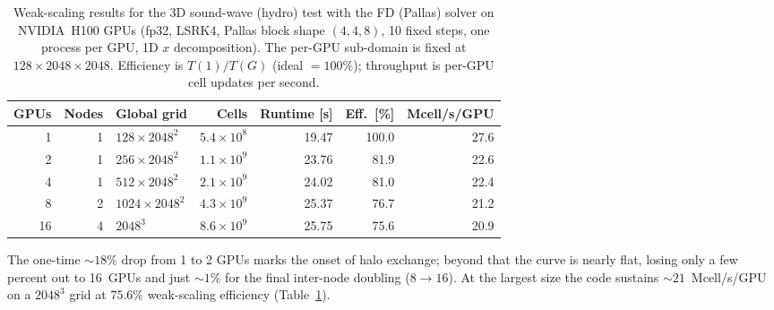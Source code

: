 \begin{table}
    \centering
    \caption{Weak-scaling results for the 3D sound-wave (hydro) test with
    the FD (Pallas) solver on NVIDIA~H100 GPUs (fp32, LSRK4, Pallas block
    shape $(4,4,8)$, 10 fixed steps, one process per GPU, 1D $x$
    decomposition). The per-GPU sub-domain is fixed at
    $128\times2048\times2048$. Efficiency is $T(1)/T(G)$ (ideal $=100\%$);
    throughput is per-GPU cell updates per second.}
    \label{tab:weak_scaling}
    \begin{tabular}{rrlrrrr}
        \toprule
        GPUs & Nodes & Global grid & Cells & Runtime [s] & Eff.\ [\%] & Mcell/s/GPU \\
        \midrule
         1 & 1 & $128\times2048^2$  & $5.4\times10^{8}$ & 19.47 & 100.0 & 27.6 \\
         2 & 1 & $256\times2048^2$  & $1.1\times10^{9}$ & 23.76 &  81.9 & 22.6 \\
         4 & 1 & $512\times2048^2$  & $2.1\times10^{9}$ & 24.02 &  81.0 & 22.4 \\
         8 & 2 & $1024\times2048^2$ & $4.3\times10^{9}$ & 25.37 &  76.7 & 21.2 \\
        16 & 4 & $2048^{3}$         & $8.6\times10^{9}$ & 25.75 &  75.6 & 20.9 \\
        \bottomrule
    \end{tabular}
\end{table}

The one-time $\sim\!18\%$ drop from 1 to 2 GPUs marks the onset of
halo exchange; beyond that the curve is nearly flat, losing only a few
percent out to 16~GPUs and just $\sim\!1\%$ for the final inter-node
doubling ($8\to16$). At the largest size the code sustains
$\sim\!21$~Mcell/s/GPU on a $2048^{3}$ grid at $75.6\%$ weak-scaling
efficiency (Table~\ref{tab:weak_scaling}).
